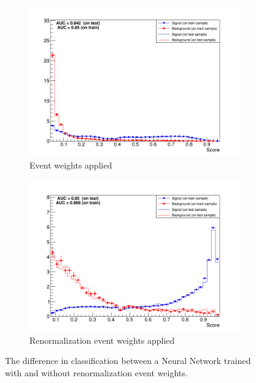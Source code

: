 \begin{figure}[H]
\begin{subfigure}{.5\textwidth}
  \centering
  \includegraphics[width=.99\linewidth]{figs/Score_w_weights}
  \caption{Event weights applied}
  \label{fig:ScoreWeights}
\end{subfigure}%
\begin{subfigure}{.5\textwidth}
  \centering
  \includegraphics[width=.99\linewidth]{figs/Score_reweighted}
  \caption{Renormalization event weights applied}
  \label{fig:ScoreRenormed}
\end{subfigure}
\caption{The difference in classification between a Neural Network trained with and without renormalization event weights.}
\label{fig:ScoreWvsR}
\end{figure}

